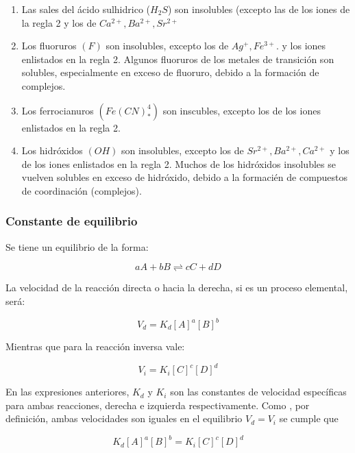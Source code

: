\begin{enumerate}
	\item Las sales del ácido sulhidrico ($H_2S$) son insolubles (excepto las de los iones de la regla 2 y los de $Ca^{2+}, Ba^{2+}, Sr^{2+}$

	\item Los fluoruros $(F)$ son insolubles, excepto los de $Ag^+, Fe^{3+}$. y los iones
	      enlistados en la regla 2. Algunos fluoruros de los metales de transición son
	      solubles, especialmente en exceso de fluoruro, debido a la formación de
	      complejos.

	\item Los ferrocianuros $(Fe(CN)^4_*)$ son inscubles, excepto los de los iones
	      enlistados en la regla 2.

	\item Los hidróxidos $(OH)$ son insolubles, excepto los de $Sr^{2+}, Ba^{2+}, Ca^{2+}$ y los de los
	      iones enlistados en la regla 2. Muchos de los hidróxidos insolubles se vuelven
	      solubles en exceso de hidróxido, debido a la formacién de compuestos de
	      coordinación (complejos).
\end{enumerate}

\subsubsection{Constante de equilibrio}

Se tiene un equilibrio de la forma:

\begin{equation}
	aA+bB\rightleftharpoons cC+dD
\end{equation}

La velocidad de la reacción directa o hacia la derecha, si es un proceso elemental, será:

\begin{equation}
	V_d=K_d[A]^a[B]^b
\end{equation}

Mientras que para la reacción inversa vale:

\begin{equation}
	V_i=K_i[C]^c[D]^d
\end{equation}

En las expresiones anteriores, $K_d$ y $K_i$ son las constantes de velocidad específicas
para ambas reacciones, derecha e izquierda respectivamente. Como , por definición, ambas velocidades son iguales en el equilibrio
$V_d=V_i$ se cumple que

\begin{equation}
	K_d[A]^a[B]^b=K_i[C]^c[D]^d
\end{equation}

